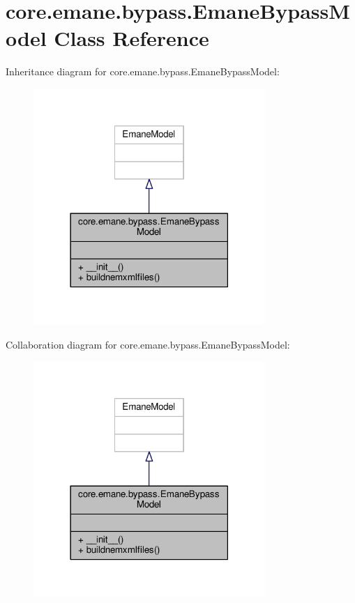 \hypertarget{classcore_1_1emane_1_1bypass_1_1_emane_bypass_model}{\section{core.\+emane.\+bypass.\+Emane\+Bypass\+Model Class Reference}
\label{classcore_1_1emane_1_1bypass_1_1_emane_bypass_model}
}


Inheritance diagram for core.\+emane.\+bypass.\+Emane\+Bypass\+Model\+:
\nopagebreak
\begin{figure}[H]
\begin{center}
\leavevmode
\includegraphics[width=249pt]{classcore_1_1emane_1_1bypass_1_1_emane_bypass_model__inherit__graph}
\end{center}
\end{figure}


Collaboration diagram for core.\+emane.\+bypass.\+Emane\+Bypass\+Model\+:
\nopagebreak
\begin{figure}[H]
\begin{center}
\leavevmode
\includegraphics[width=249pt]{classcore_1_1emane_1_1bypass_1_1_emane_bypass_model__coll__graph}
\end{center}
\end{figure}
